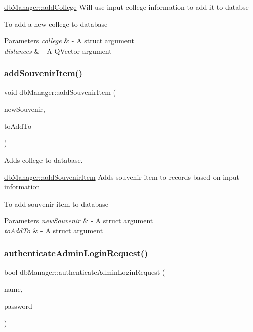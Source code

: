 \mbox{\hyperlink{classdb_manager_ae466201599ce67617d769a1196714bf1}{db\+Manager\+::add\+College}} Will use input college information to add it to databse

To add a new college to database 
\begin{DoxyParams}{Parameters}
{\em college} & -\/ A struct argument \\
\hline
{\em distances} & -\/ A Q\+Vector argument \\
\hline
\end{DoxyParams}
\mbox{\label{classdb_manager_aa52b30e936de3c8c7b561c6d6c6a4cd6}} 
\subsubsection{\texorpdfstring{add\+Souvenir\+Item()}{addSouvenirItem()}}
{\footnotesize\ttfamily void db\+Manager\+::add\+Souvenir\+Item (\begin{DoxyParamCaption}\item[{\mbox{\hyperlink{structsouvenir_item}{souvenir\+Item}}}]{new\+Souvenir,  }\item[{\mbox{\hyperlink{struct_college}{College}}}]{to\+Add\+To }\end{DoxyParamCaption})}



Adds college to database. 

\mbox{\hyperlink{classdb_manager_aa52b30e936de3c8c7b561c6d6c6a4cd6}{db\+Manager\+::add\+Souvenir\+Item}} Adds souvenir item to records based on input information

To add souvenir item to database 
\begin{DoxyParams}{Parameters}
{\em new\+Souvenir} & -\/ A struct argument \\
\hline
{\em to\+Add\+To} & -\/ A struct argument \\
\hline
\end{DoxyParams}
\mbox{\label{classdb_manager_a0ce2c2fa322e30e512165509811544fa}} 
\subsubsection{\texorpdfstring{authenticate\+Admin\+Login\+Request()}{authenticateAdminLoginRequest()}}
{\footnotesize\ttfamily bool db\+Manager\+::authenticate\+Admin\+Login\+Request (\begin{DoxyParamCaption}\item[{Q\+String}]{name,  }\item[{Q\+String}]{password }\end{DoxyParamCaption})}



